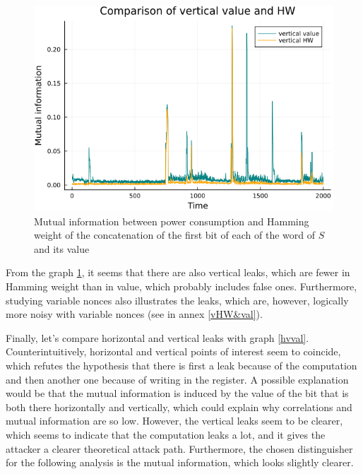 \documentclass[11pt,technote]{IEEEtran}
\begin{document}
	\begin{figure}[h!]
		\centering
		\includegraphics[scale=0.4]{img_files/vertical_one_bit}
		\caption{Mutual information between power consumption and Hamming weight of the concatenation of the first bit of each of the word of $S$ and its value}
		\label{vHW}
	\end{figure}
	
	From the graph \ref{vHW}, it seems that there are also vertical leaks, which are fewer in Hamming weight than in value, which probably includes false ones. Furthermore, studying variable nonces also illustrates the leaks, which are, however, logically more noisy with variable nonces (see in annex \ref{vHW&val}).
	
	Finally, let's compare horizontal and vertical leaks with graph \ref{hvval}. Counterintuitively, horizontal and vertical points of interest seem to coincide, which refutes the hypothesis that there is first a leak because of the computation and then another one because of writing in the register. A possible explanation would be that the mutual information is induced by the value of the bit that is both there horizontally and vertically, which could explain why correlations and mutual information are so low. However, the vertical leaks seem to be clearer, which seems to indicate that the computation leaks a lot, and it gives the attacker a clearer theoretical attack path. Furthermore, the chosen distinguisher for the following analysis is the mutual information, which looks slightly clearer.
	
\end{document}
